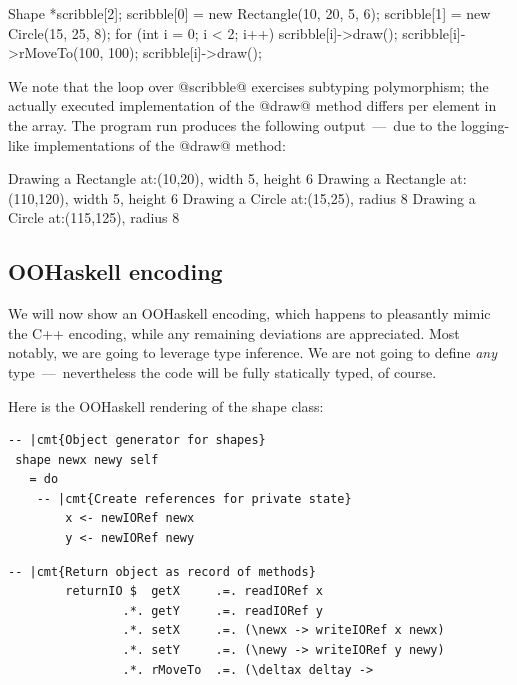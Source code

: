 \documentclass{jfp}
\begin{document}
\begin{code}
 Shape *scribble[2];
 scribble[0] = new Rectangle(10, 20, 5, 6);
 scribble[1] = new Circle(15, 25, 8);
 for (int i = 0; i < 2; i++) {
   scribble[i]->draw();
   scribble[i]->rMoveTo(100, 100);
   scribble[i]->draw();
 }
\end{code}

We note that the loop over @scribble@ exercises subtyping
polymorphism; the actually executed implementation of the @draw@
method differs per element in the array. The program run produces the
following output~---~due to the logging-like implementations of the
@draw@ method:

\begin{code}
 Drawing a Rectangle at:(10,20), width 5, height 6
 Drawing a Rectangle at:(110,120), width 5, height 6
 Drawing a Circle at:(15,25), radius 8
 Drawing a Circle at:(115,125), radius 8
\end{code}






\subsection{OOHaskell encoding}

We will now show an OOHaskell encoding, which happens to pleasantly
mimic the C++ encoding, while any remaining deviations are
appreciated. Most notably, we are going to leverage type inference.
We are not going to define \emph{any} type~---~nevertheless the code
will be fully statically typed, of course.

\smallskip

Here is the OOHaskell rendering of the shape class:

\begin{Verbatim}[fontsize=\small,commandchars=\|\{\}]
 -- |cmt{Object generator for shapes}
 shape newx newy self
   = do
	-- |cmt{Create references for private state}
        x <- newIORef newx
        y <- newIORef newy
\end{Verbatim}

\begin{Verbatim}[fontsize=\small,commandchars=\|\{\}]
	-- |cmt{Return object as record of methods}
        returnIO $  getX     .=. readIORef x
                .*. getY     .=. readIORef y
                .*. setX     .=. (\newx -> writeIORef x newx)
                .*. setY     .=. (\newy -> writeIORef y newy)
                .*. rMoveTo  .=. (\deltax deltay -> 
\end{Verbatim}
\end{document}
